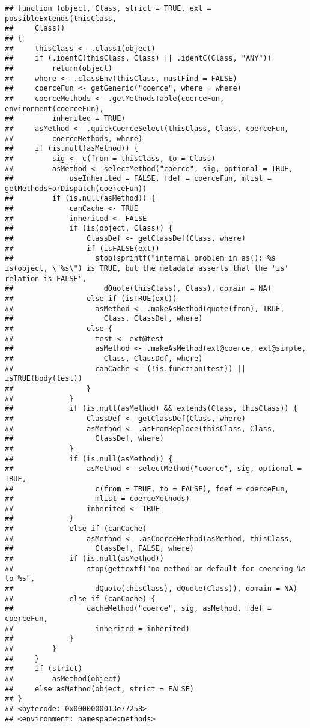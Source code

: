 \documentclass[
]{article}
\begin{document}
\begin{verbatim}
## function (object, Class, strict = TRUE, ext = possibleExtends(thisClass, 
##     Class)) 
## {
##     thisClass <- .class1(object)
##     if (.identC(thisClass, Class) || .identC(Class, "ANY")) 
##         return(object)
##     where <- .classEnv(thisClass, mustFind = FALSE)
##     coerceFun <- getGeneric("coerce", where = where)
##     coerceMethods <- .getMethodsTable(coerceFun, environment(coerceFun), 
##         inherited = TRUE)
##     asMethod <- .quickCoerceSelect(thisClass, Class, coerceFun, 
##         coerceMethods, where)
##     if (is.null(asMethod)) {
##         sig <- c(from = thisClass, to = Class)
##         asMethod <- selectMethod("coerce", sig, optional = TRUE, 
##             useInherited = FALSE, fdef = coerceFun, mlist = getMethodsForDispatch(coerceFun))
##         if (is.null(asMethod)) {
##             canCache <- TRUE
##             inherited <- FALSE
##             if (is(object, Class)) {
##                 ClassDef <- getClassDef(Class, where)
##                 if (isFALSE(ext)) 
##                   stop(sprintf("internal problem in as(): %s is(object, \"%s\") is TRUE, but the metadata asserts that the 'is' relation is FALSE", 
##                     dQuote(thisClass), Class), domain = NA)
##                 else if (isTRUE(ext)) 
##                   asMethod <- .makeAsMethod(quote(from), TRUE, 
##                     Class, ClassDef, where)
##                 else {
##                   test <- ext@test
##                   asMethod <- .makeAsMethod(ext@coerce, ext@simple, 
##                     Class, ClassDef, where)
##                   canCache <- (!is.function(test)) || isTRUE(body(test))
##                 }
##             }
##             if (is.null(asMethod) && extends(Class, thisClass)) {
##                 ClassDef <- getClassDef(Class, where)
##                 asMethod <- .asFromReplace(thisClass, Class, 
##                   ClassDef, where)
##             }
##             if (is.null(asMethod)) {
##                 asMethod <- selectMethod("coerce", sig, optional = TRUE, 
##                   c(from = TRUE, to = FALSE), fdef = coerceFun, 
##                   mlist = coerceMethods)
##                 inherited <- TRUE
##             }
##             else if (canCache) 
##                 asMethod <- .asCoerceMethod(asMethod, thisClass, 
##                   ClassDef, FALSE, where)
##             if (is.null(asMethod)) 
##                 stop(gettextf("no method or default for coercing %s to %s", 
##                   dQuote(thisClass), dQuote(Class)), domain = NA)
##             else if (canCache) {
##                 cacheMethod("coerce", sig, asMethod, fdef = coerceFun, 
##                   inherited = inherited)
##             }
##         }
##     }
##     if (strict) 
##         asMethod(object)
##     else asMethod(object, strict = FALSE)
## }
## <bytecode: 0x0000000013e77258>
## <environment: namespace:methods>
\end{verbatim}
\end{document}
